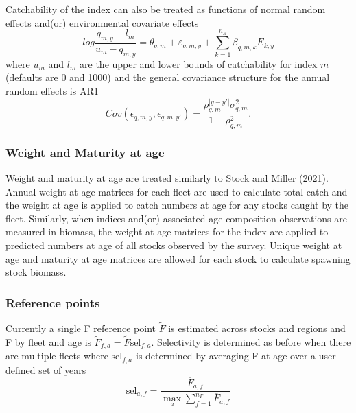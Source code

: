 \documentclass[
]{article}
\begin{document}
Catchability of the index can also be treated as functions of normal
random effects and(or) environmental covariate effects
\[log \frac{q_{m,y}-l_m}{u_m-q_{m,y}} = \theta_{q,m} + \varepsilon_{q,m,y}  + \sum^{n_E}_{k=1} \beta_{q,m,k} E_{k,y}\]
where \(u_{m}\) and \(l_{m}\) are the upper and lower bounds of
catchability for index \(m\) (defaults are 0 and 1000) and the general
covariance structure for the annual random effects is AR1
\[Cov\left(\epsilon_{q,m,y},\epsilon_{q,m,y'}\right) =   \frac{\rho_{q,m}^{|y-y'|}\sigma^2_{q,m}}{1 - \rho_{q,m}^2}.\]

\hypertarget{weight-and-maturity-at-age}{%
\subsubsection*{Weight and Maturity at
age}\label{weight-and-maturity-at-age}}

Weight and maturity at age are treated similarly to Stock and Miller
(2021). Annual weight at age matrices for each fleet are used to
calculate total catch and the weight at age is applied to catch numbers
at age for any stocks caught by the fleet. Similarly, when indices
and(or) associated age composition observations are measured in biomass,
the weight at age matrices for the index are applied to predicted
numbers at age of all stocks observed by the survey. Unique weight at
age and maturity at age matrices are allowed for each stock to calculate
spawning stock biomass.

\hypertarget{reference-points}{%
\subsubsection*{Reference points}\label{reference-points}}

Currently a single F reference point \(\widetilde F\) is estimated
across stocks and regions and F by fleet and age is
\(\widetilde F_{f,a} = \widetilde F \text{sel}_{f,a}\). Selectivity is
determined as before when there are multiple fleets where
\(\text{sel}_{f,a}\) is determined by averaging F at age over a
user-defined set of years \begin{equation*}
  \text{sel}_{a,f} = \frac{\overline F_{a,f}}{\max_a \sum^{n_F}_{f=1}{\overline F}_{a,f}}
\end{equation*}
\end{document}
